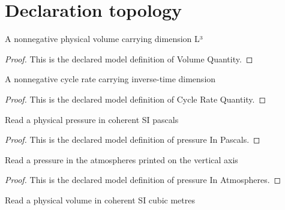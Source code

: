 \section{Declaration topology}
\begin{definition}
  \label{def:physics:phyx-mini-0427:phyxminiproblems-problemphyxmini0427-volumequantity}
  A nonnegative physical volume carrying dimension L³
\end{definition}
\begin{proof}
  This is the declared model definition of Volume Quantity.
\end{proof}
\begin{definition}
  \label{def:physics:phyx-mini-0427:phyxminiproblems-problemphyxmini0427-cycleratequantity}
  A nonnegative cycle rate carrying inverse-time dimension
\end{definition}
\begin{proof}
  This is the declared model definition of Cycle Rate Quantity.
\end{proof}
\begin{definition}
  \label{def:physics:phyx-mini-0427:phyxminiproblems-problemphyxmini0427-pressureinpascals}
  Read a physical pressure in coherent SI pascals
\end{definition}
\begin{proof}
  This is the declared model definition of pressure In Pascals.
\end{proof}
\begin{definition}
  \label{def:physics:phyx-mini-0427:phyxminiproblems-problemphyxmini0427-pressureinatmospheres}
  Read a pressure in the atmospheres printed on the vertical axis
\end{definition}
\begin{proof}
  This is the declared model definition of pressure In Atmospheres.
\end{proof}
\begin{definition}
  \label{def:physics:phyx-mini-0427:phyxminiproblems-problemphyxmini0427-volumeincubicmetres}
  Read a physical volume in coherent SI cubic metres
\end{definition}

